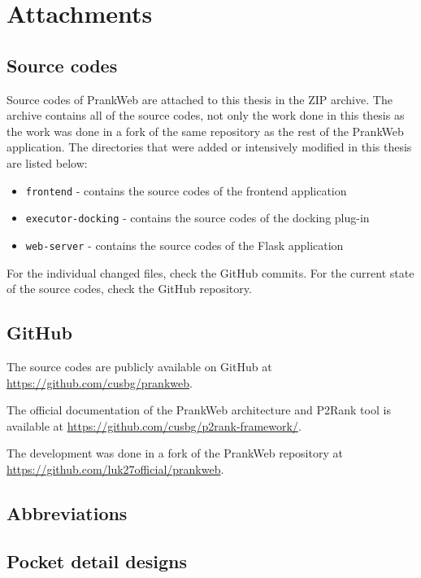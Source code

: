 \chapter{Attachments}

\section{Source codes}
\label{sec:source_codes}

Source codes of PrankWeb are attached to this thesis in the ZIP archive. The archive contains all of the source codes, not only the work done in this thesis as the work was done in a fork of the same repository as the rest of the PrankWeb application. The directories that were added or intensively modified in this thesis are listed below:
\begin{itemize}
    \item \texttt{frontend} - contains the source codes of the frontend application
    \item \texttt{executor-docking} - contains the source codes of the docking plug-in
    \item \texttt{web-server} - contains the source codes of the Flask application
\end{itemize}

For the individual changed files, check the GitHub commits. For the current state of the source codes, check the GitHub repository.

\section{GitHub}
\label{sec:github}

The source codes are publicly available on GitHub at \url{https://github.com/cusbg/prankweb}.

The official documentation of the PrankWeb architecture and P2Rank tool is available at \url{https://github.com/cusbg/p2rank-framework/}.

The development was done in a fork of the PrankWeb repository at \url{https://github.com/luk27official/prankweb}.

\section{Abbreviations}
\label{sec:abbreviations}

\section{Pocket detail designs}
\label{sec:pocket_detail_designs}


